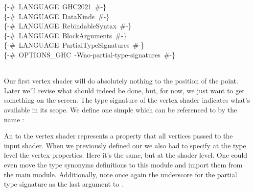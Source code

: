 \begin{hscode}\SaveRestoreHook
{}%
%
\>[B]{}\mbox{\enskip\{-\# LANGUAGE GHC2021  \#-\}\enskip}{}\<[E]%
\\
\>[B]{}\mbox{\enskip\{-\# LANGUAGE DataKinds  \#-\}\enskip}{}\<[E]%
\\
\>[B]{}\mbox{\enskip\{-\# LANGUAGE RebindableSyntax  \#-\}\enskip}{}\<[E]%
\\
\>[B]{}\mbox{\enskip\{-\# LANGUAGE BlockArguments  \#-\}\enskip}{}\<[E]%
\\
\>[B]{}\mbox{\enskip\{-\# LANGUAGE PartialTypeSignatures  \#-\}\enskip}{}\<[E]%
\\
\>[B]{}\mbox{\enskip\{-\# OPTIONS\_GHC -Wno-partial-type-signatures  \#-\}\enskip}{}\<[E]%
\\
\>[B]{}\;\<[E]%
\\
\>[B]{}\;\<[E]%
\ColumnHook
\end{hscode}\resethooks

Our first vertex shader will do absolutely nothing to the position of the point.
Later we'll revise what should indeed be done, but, for now, we just want to get
something on the screen. The type signature of the vertex shader indicates
what's available in its scope. We define one simple  which can be
referenced to by the name :
\resethooks
An  to the vertex shader represents a property that all vertices passed
to the input shader. When we previously defined our  we also had to
specify at the type level the vertex properties. Here it's the same, but at the
shader level. One could even move the type synonyms definitions to this module
and import them from the main module. Additionally, note once again the
underscore for the partial type signature as the last argument to
.

